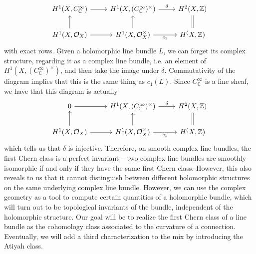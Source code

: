 \documentclass[psamsfonts, 12pt]{amsart}
\theoremstyle{definition}
\theoremstyle{remark}
\renewcommand{\O}{\mathcal{O}}
\newcommand{\Z}{\mathbb{Z}}
\newcommand{\C}{\mathbb{C}}
\begin{document}
\[\begin{tikzcd}
H^1(X,C^\infty_\C) \ar[r] & H^1(X, (C^\infty_\C)^\times) \ar[r, "\delta"] & H^2(X,\Z) \\
H^1(X, \O_X) \ar[r] \ar[u] & H^1(X, \O_X^\times)
\ar[u] \ar[r, "c_1"'] & H^(X, \Z) \ar[u, equal]
\end{tikzcd}\]
with exact rows. Given a holomorphic line bundle $L$, we can forget its complex
structure, regarding it as a complex line bundle, i.e. an element of
$H^1(X, (C^\infty_\C)^\times)$, and then take the image under $\delta$. Commutativity
of the diagram implies that this is the same thing as $c_1(L)$. Since
$C^\infty_\C$ is a fine sheaf, we have that this diagram is actually
\[\begin{tikzcd}
0 \ar[r] & H^1(X, (C_\C^\infty)^\times) \ar[r, "\delta"] & H^2(X,\Z) \\
H^1(X, \O_X) \ar[r] \ar[u] & H^1(X, \O_X^\times)
\ar[u] \ar[r, "c_1"'] & H^(X, \Z) \ar[u, equal]
\end{tikzcd}\]
which tells us that $\delta$ is injective. Therefore, on smooth complex line bundles,
the first Chern class is a perfect invariant -- two complex line bundles are smoothly
isomorphic if and only if they have the same first Chern class. However, this also
reveals to us that it cannot distinguish between different holomorphic structures
on the same underlying complex line bundle. However, we can use the complex geometry as
a tool  to compute certain quantities of a holomorphic bundle, which will turn out to be
topological invariants of the bundle, independent of the holomorphic structure. Our goal
will be to realize the first Chern class of a line bundle as the cohomology class
associated to the curvature of a connection. Eventually, we will add a third characterization
to the mix by introducing the Atiyah class. \\
\end{document}
